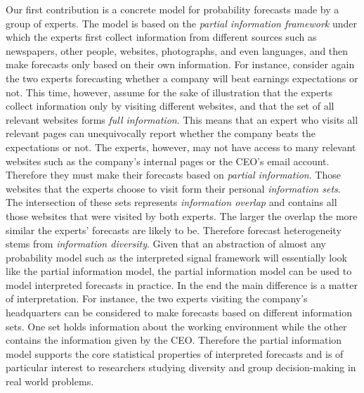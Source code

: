 \documentclass[11pt]{article}
\theoremstyle{definition}
\theoremstyle{definition}
\begin{document}
Our first contribution is a concrete model for probability forecasts made by a group of experts. The model is based on the \textit{partial information framework} under which the experts first collect information from different sources such as newspapers, other people, websites, photographs, and even languages, and then make forecasts only based on their own information. For instance, consider again the two experts forecasting whether a company will beat earnings expectations or not. This time, however, assume for the sake of illustration that the experts collect information only by visiting different websites, and that the set of all relevant websites forms \textit{full information}. This means that an expert who visits all relevant pages can unequivocally report whether the company beats the expectations or not. The experts, however, may not have access to many relevant websites such as the company's internal pages or the CEO's email account. Therefore they must make their forecasts based on \textit{partial information}. Those websites that the experts choose to visit form their personal \textit{information sets}. The intersection of these sets represents \textit{information overlap} and contains all  those websites that were visited by both experts. The larger the overlap the more similar the experts' forecasts are likely to be. Therefore forecast heterogeneity stems from \textit{information diversity}. 
Given that an abstraction of almost any probability model  such as the interpreted signal framework will essentially look like the partial information model, the partial information model can be used to model interpreted forecasts in practice. In the end the main difference is a matter of interpretation. For instance, the two experts visiting the company's headquarters can be considered to make forecasts based on different information sets. One set holds information about the working environment while the other contains the information given by the CEO. Therefore the partial information model supports the core statistical properties of interpreted forecasts and is of particular interest to researchers studying diversity and group decision-making in real world problems.  
\end{document}
